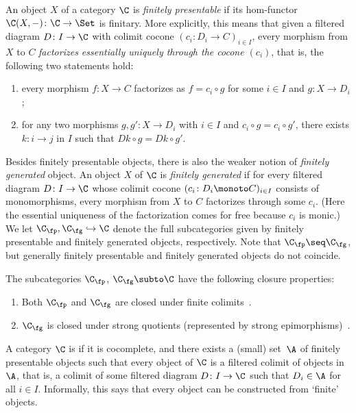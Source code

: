 An object $X$ of a category $\C$ is \emph{finitely presentable} if its hom-functor $\C(X,-)\colon \C\to \Set$ is finitary. More explicitly, this means that given a filtered diagram $D\colon I\to \C$ with colimit cocone $(c_i\colon D_i\to C)_{i\in I}$, every morphism from $X$ to $C$ \emph{factorizes essentially uniquely through the cocone $(c_i)$}, that is, the following two statements hold:
\begin{enumerate}
\item every morphism $f\colon X\to C$ factorizes as $f=c_i\circ g$ for some $i\in I$ and $g\colon X\to D_i$;
\item for any two morphisms $g,g'\colon X\to D_i$ with $i\in I$ and $c_i\circ g = c_i\circ g'$, there exists $k\colon i\to j$ in $I$ such that $Dk\circ g = Dk\circ g'$.
\end{enumerate}
Besides finitely presentable objects, there is also the weaker notion of \emph{finitely generated} object. An object $X$ of $\C$ is \emph{finitely generated} if for every filtered diagram $D\colon I\to \C$ whose colimit cocone $(c_i\colon D_i\monoto C)_{i\in I}$ consists of monomorphisms, every morphism from $X$ to $C$ factorizes through some $c_i$. (Here the essential uniqueness of the factorization comes for free because $c_i$ is monic.) We let $\C_\fp,\C_\fg\hookrightarrow \C$ denote the full subcategories given by finitely presentable and finitely generated objects, respectively. Note that $\C_\fp\seq \C_\fg$, but generally finitely presentable and finitely generated objects do not coincide. 

\begin{notheorembrackets}
\begin{lemma}\label{lem:fp-fp-fin-colimits} The subcategories $\C_\fp$, $\C_\fg \subto \C$ have the following closure properties:
\begin{enumerate}
\item Both $\C_\fp$ and $\C_\fg$ are closed under finite colimits~\cite[Prop.~1.3]{adamek_rosicky_1994}. 
\item $\C_\fg$ is closed under strong quotients (represented by strong epimorphisms)~\cite[Prop.~1.69]{adamek_rosicky_1994}.
\end{enumerate}
\end{lemma}
\end{notheorembrackets}

A category $\C$ is \emph{\lfplong} if it is cocomplete, and there exists a (small) set~$\A$ of finitely presentable objects such that every object of $\C$ is a filtered colimit of objects in $\A$, that is, a colimit of some filtered diagram $D\colon I\to \C$ such that $D_i\in \A$ for all $i\in I$. Informally, this says that every object can be constructed from `finite' objects.


